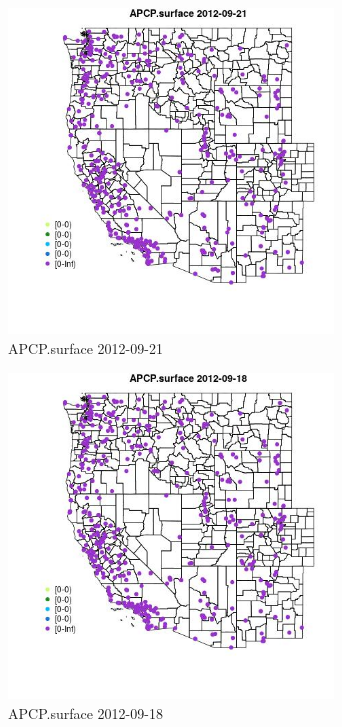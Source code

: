 \begin{figure} 
\centering  
\includegraphics[width=0.77\textwidth]{Code_Outputs/Report_ML_input_PM25_Step4_part_e_de_duplicated_aves_compiled_2019-05-14wNAs_MapObsAPCPsurface2012-09-21.jpg} 
\caption{\label{fig:Report_ML_input_PM25_Step4_part_e_de_duplicated_aves_compiled_2019-05-14wNAsMapObsAPCPsurface2012-09-21}APCP.surface 2012-09-21} 
\end{figure} 
 

\begin{figure} 
\centering  
\includegraphics[width=0.77\textwidth]{Code_Outputs/Report_ML_input_PM25_Step4_part_e_de_duplicated_aves_compiled_2019-05-14wNAs_MapObsAPCPsurface2012-09-18.jpg} 
\caption{\label{fig:Report_ML_input_PM25_Step4_part_e_de_duplicated_aves_compiled_2019-05-14wNAsMapObsAPCPsurface2012-09-18}APCP.surface 2012-09-18} 
\end{figure} 
 

